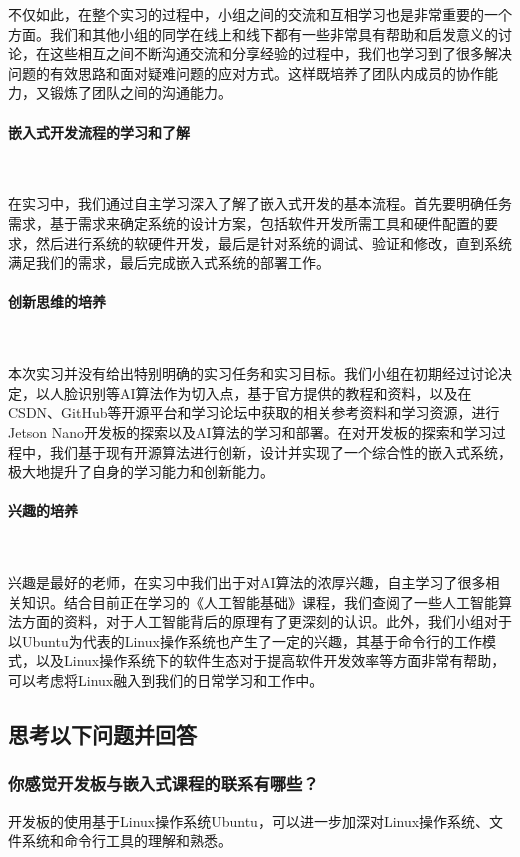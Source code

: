 \documentclass[UTF8]{article}
\begin{document}
不仅如此，在整个实习的过程中，小组之间的交流和互相学习也是非常重要的一个方面。我们和其他小组的同学在线上和线下都有一些非常具有帮助和启发意义的讨论，在这些相互之间不断沟通交流和分享经验的过程中，我们也学习到了很多解决问题的有效思路和面对疑难问题的应对方式。这样既培养了团队内成员的协作能力，又锻炼了团队之间的沟通能力。

\paragraph{嵌入式开发流程的学习和了解}~{}

在实习中，我们通过自主学习深入了解了嵌入式开发的基本流程。首先要明确任务需求，基于需求来确定系统的设计方案，包括软件开发所需工具和硬件配置的要求，然后进行系统的软硬件开发，最后是针对系统的调试、验证和修改，直到系统满足我们的需求，最后完成嵌入式系统的部署工作。

\paragraph{创新思维的培养}~{}

本次实习并没有给出特别明确的实习任务和实习目标。我们小组在初期经过讨论决定，以人脸识别等AI算法作为切入点，基于官方提供的教程和资料，以及在CSDN、GitHub等开源平台和学习论坛中获取的相关参考资料和学习资源，进行Jetson Nano开发板的探索以及AI算法的学习和部署。在对开发板的探索和学习过程中，我们基于现有开源算法进行创新，设计并实现了一个综合性的嵌入式系统，极大地提升了自身的学习能力和创新能力。

\paragraph{兴趣的培养}~{}

兴趣是最好的老师，在实习中我们出于对AI算法的浓厚兴趣，自主学习了很多相关知识。结合目前正在学习的《人工智能基础》课程，我们查阅了一些人工智能算法方面的资料，对于人工智能背后的原理有了更深刻的认识。此外，我们小组对于以Ubuntu为代表的Linux操作系统也产生了一定的兴趣，其基于命令行的工作模式，以及Linux操作系统下的软件生态对于提高软件开发效率等方面非常有帮助，可以考虑将Linux融入到我们的日常学习和工作中。


\subsection{思考以下问题并回答}
\subsubsection{你感觉开发板与嵌入式课程的联系有哪些？} 
开发板的使用基于Linux操作系统Ubuntu，可以进一步加深对Linux操作系统、文件系统和命令行工具的理解和熟悉。
\end{document}
